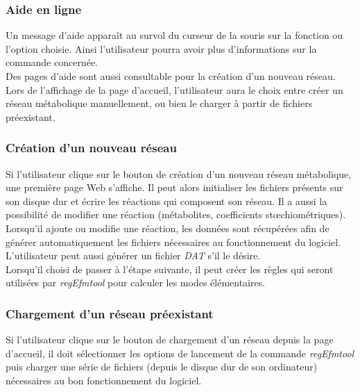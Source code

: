 \subsubsection{Aide en ligne}
Un message d'aide apparaît au survol du curseur de la souris sur la fonction ou l'option choisie. Ainsi l'utilisateur pourra avoir plus d'informations sur la commande concernée.\\
Des pages d'aide sont aussi consultable pour la création d'un nouveau réseau.\\

Lors de l'affichage de la page d'accueil, l'utilisateur aura le choix entre créer un réseau métabolique manuellement, ou bien le charger à partir de fichiers préexistant. 
			
\subsubsection{Création d'un nouveau réseau}

Si l'utilisateur clique sur le bouton de création d'un nouveau réseau métabolique, une première page Web s'affiche. Il peut alors initialiser les fichiers présents sur son disque dur et écrire les réactions qui composent son réseau. Il a aussi la possibilité de modifier une réaction (métabolites, coefficients stœchiométriques). Lorsqu'il ajoute ou modifie une réaction, les données sont récupérées afin de générer automatiquement les fichiers nécessaires au fonctionnement du logiciel.
L'utilisateur peut aussi générer un fichier \emph{DAT} s'il le désire.\\
Lorsqu'il choisi de passer à l'étape suivante, il peut créer les règles qui seront utilisées par \emph{regEfmtool} pour calculer les modes élémentaires.

\subsubsection{Chargement d'un réseau préexistant}

Si l'utilisateur clique sur le bouton de chargement d'un réseau depuis la page d'accueil, il doit sélectionner les options de lancement de la commande \emph{regEfmtool} puis charger une série de fichiers (depuis le disque dur de son ordinateur) nécessaires au bon fonctionnement du logiciel. %

